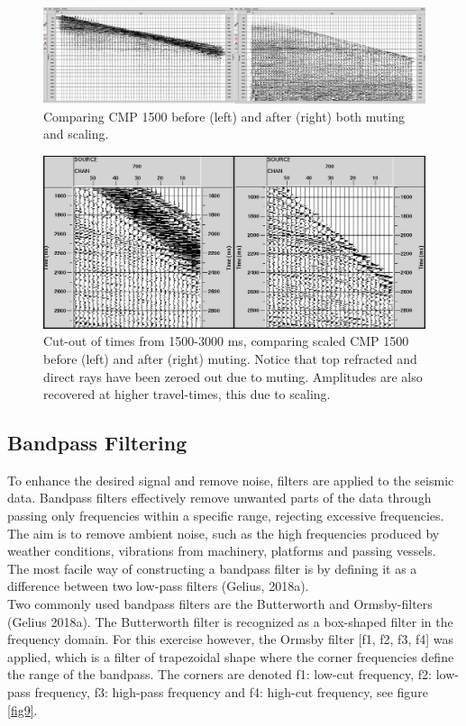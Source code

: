 \documentclass[10pt,a4paper]{article}
\begin{document}
\begin{figure}[H]
\includegraphics[width=\textwidth]{fig7ekte.jpg}
\caption{Comparing CMP 1500 before (left) and after (right) both muting and scaling.}
\label{fig7}
\end{figure}

\begin{figure}[H]
\includegraphics[width=\textwidth]{fig8.jpg}
\caption{Cut-out of times from 1500-3000 ms, comparing scaled CMP 1500 before (left) and after (right) muting. Notice that top refracted and direct rays have been zeroed out due to muting. Amplitudes are also recovered at higher travel-times, this due to scaling.}
\label{fig8}
\end{figure}

\subsection{Bandpass Filtering}


To enhance the desired signal and remove noise, filters are applied to the seismic data. Bandpass filters effectively remove unwanted parts of the data through passing only frequencies within a specific range, rejecting excessive frequencies. The aim is to remove ambient noise, such as the high frequencies produced by weather conditions, vibrations from machinery, platforms and passing vessels. The most facile way of constructing a bandpass filter is by defining it as a difference between two low-pass filters (Gelius, 2018a). 
\\
Two commonly used bandpass filters are the Butterworth and Ormsby-filters (Gelius 2018a). The Butterworth filter is recognized as a box-shaped filter in the frequency domain. For this exercise however, the Ormsby filter [f1, f2, f3, f4] was applied, which is a filter of trapezoidal shape where the corner frequencies define the range of the bandpass. The corners are denoted f1: low-cut frequency, f2: low-pass frequency, f3: high-pass frequency and f4: high-cut frequency, see figure \ref{fig9}.
\end{document}
